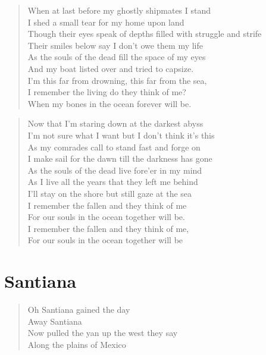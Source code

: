\documentclass[8pt,twoside]{extarticle}
\newenvironment{xverse}{
	\interlinepenalty 10000
	\begin{verse}
	\begin{minipage}{\linewidth}
	\parskip 5pt
	\vspace{-6pt}
	}
	{
	\end{minipage}
	\end{verse}
	\penalty 0
	\vspace{-6pt}
	}
\begin{document}
\begin{xverse}
When at last before my ghostly shipmates I stand \\
I shed a small tear for my home upon land \\
Though their eyes speak of depths filled with struggle and strife \\
Their smiles below say I don’t owe them my life \\
As the souls of the dead fill the space of my eyes \\
And my boat listed over and tried to capsize. \\
I’m this far from drowning, this far from the sea, \\
I remember the living do they think of me? \\
When my bones in the ocean forever will be. \\
\end{xverse}

\begin{xverse}
Now that I’m staring down at the darkest abyss \\
I’m not sure what I want but I don’t think it’s this \\
As my comrades call to stand fast and forge on \\
I make sail for the dawn till the darkness has gone \\
As the souls of the dead live fore’er in my mind \\
As I live all the years that they left me behind \\
I’ll stay on the shore but still gaze at the sea \\
I remember the fallen and they think of me \\
For our souls in the ocean together will be. \\
I remember the fallen and they think of me, \\
For our souls in the ocean together will be \\
\end{xverse}


\section{Santiana}

\begin{xverse}
Oh Santiana gained the day \\
Away Santiana \\
Now pulled the yan up the west they say \\
Along the plains of Mexico \\
\end{xverse}
\end{document}
